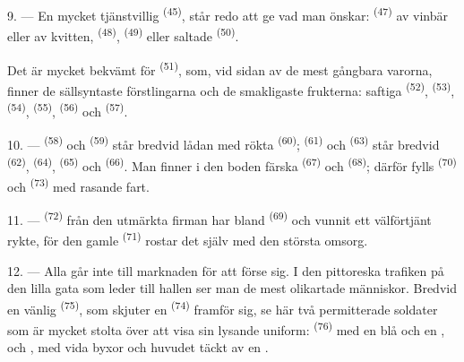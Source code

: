 9. --- En mycket tjänstvillig  \textsuperscript{(45)}, står redo
att ge vad man önskar:  \textsuperscript{(47)} av vinbär eller av kvitten,
 \textsuperscript{(48)},  \textsuperscript{(49)} eller
saltade  \textsuperscript{(50)}.

Det är mycket bekvämt för  \textsuperscript{(51)}, som, vid sidan av de mest
gångbara varorna, finner de sällsyntaste förstlingarna och de smakligaste frukterna: saftiga
 \textsuperscript{(52)},
 \textsuperscript{(53)}, 
\textsuperscript{(54)},  \textsuperscript{(55)},
 \textsuperscript{(56)} och 
\textsuperscript{(57)}.

\VUsaut{4.0mm}
\VUsaut{3.0mm}

10. ---  \textsuperscript{(58)} och  \textsuperscript{(59)}
står bredvid lådan med rökta  \textsuperscript{(60)}; 
\textsuperscript{(61)} och
 \textsuperscript{(63)} står bredvid 
\textsuperscript{(62)},  \textsuperscript{(64)},
 \textsuperscript{(65)} och 
\textsuperscript{(66)}. Man finner i den boden färska  \textsuperscript{(67)} och
 \textsuperscript{(68)}; därför fylls
 \textsuperscript{(70)} och 
\textsuperscript{(73)} med rasande fart.

11. ---  \textsuperscript{(72)} från den utmärkta firman har bland
 \textsuperscript{(69)} och  vunnit ett
välförtjänt rykte, för den gamle  \textsuperscript{(71)} rostar det
själv med den största omsorg.

\VUsaut{4.0mm}
\VUsaut{3.0mm}

12. --- Alla går inte till marknaden för att förse sig. I den pittoreska trafiken på den lilla
gata som leder till hallen ser man de mest olikartade människor. Bredvid en vänlig
 \textsuperscript{(75)}, som skjuter en 
\textsuperscript{(74)} framför sig, se här två permitterade soldater som är mycket stolta över
att visa sin lysande uniform:
 \textsuperscript{(76)} med en blå  och en
, och , med vida byxor och
huvudet täckt av en .

